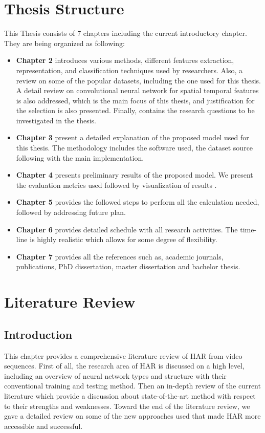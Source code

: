 \section{Thesis Structure}
\hspace{5mm} This Thesis consists of 7 chapters including the current introductory chapter. They are being organized as following:\\
\begin{itemize}
\item \textbf{Chapter 2} introduces various methods, different features extraction, representation, and classification techniques used by researchers. Also, a review on some of the popular datasets, including the one used for this thesis. A detail review on convolutional neural network for spatial temporal features is also addressed, which is the main focus of this thesis, and justification for the selection is also presented. Finally, contains the research questions to be investigated in the thesis.
\item \textbf{Chapter 3} present a detailed explanation of the proposed model used for this thesis. The methodology includes the software used, the dataset source following with the main implementation.
\item \textbf{Chapter 4} presents preliminary results of the proposed model. We present the evaluation metrics used followed by visualization of results .
\item \textbf{Chapter 5} provides the followed steps to perform all the calculation needed, followed by addressing future plan. 
\item \textbf{Chapter 6} provides detailed schedule with all research activities. The time-line is highly realistic which allows for some degree of flexibility.
\item \textbf{Chapter 7} provides all the references such as, academic journals, publications, PhD dissertation, master dissertation and bachelor thesis.
\end{itemize}

\section{Literature Review}


\subsection{Introduction}
\hspace{5mm} This chapter provides a comprehensive literature review of HAR from video sequences. First of all, the research area of HAR is discussed on a high level, including an overview of neural network types and structure with their conventional training and testing method. Then an in-depth review of the current literature which provide a discussion about state-of-the-art method with respect to their strengths and weaknesses. Toward the end of the literature review, we gave a detailed review on some of the new approaches used that made HAR more accessible and successful.

